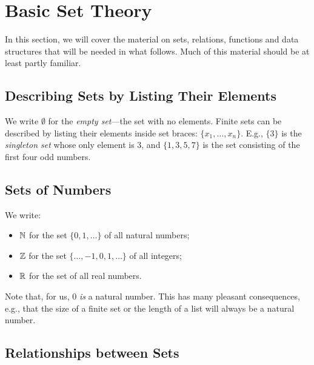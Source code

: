 \section{Basic Set Theory}
\label{BasisSetTheory}

%
In this section, we will cover the material on sets, relations,
functions and data structures that will be needed in what follows.
Much of this material should be at least partly familiar.

\subsection{Describing Sets by Listing Their Elements}

We write $\emptyset$
%
%
%
%
for the \emph{empty set}---the set with no elements.  Finite sets can
be described by listing their elements inside set braces: $\{x_1,
\ldots, x_n\}$.
%
%
E.g., $\{3\}$ is the \emph{singleton set}
%
%
whose only element is $3$, and $\{1, 3, 5, 7\}$ is the set consisting
of the first four odd numbers.

\subsection{Sets of Numbers}

We write:
\begin{itemize}
\item $\mathbb{N}$
%
for the set $\{0, 1, \ldots\}$ of all natural numbers;
%

\item $\mathbb{Z}$
%
for the set $\{\ldots, -1, 0, 1, \ldots\}$ of all integers;
%

\item $\mathbb{R}$
%
for the set of all real numbers.
%
\end{itemize}
Note that, for us, $0$ \emph{is} a natural number.  This has many
pleasant consequences, e.g., that the size of a finite set or
the length of a list will always be a natural number.

\subsection{Relationships between Sets}

